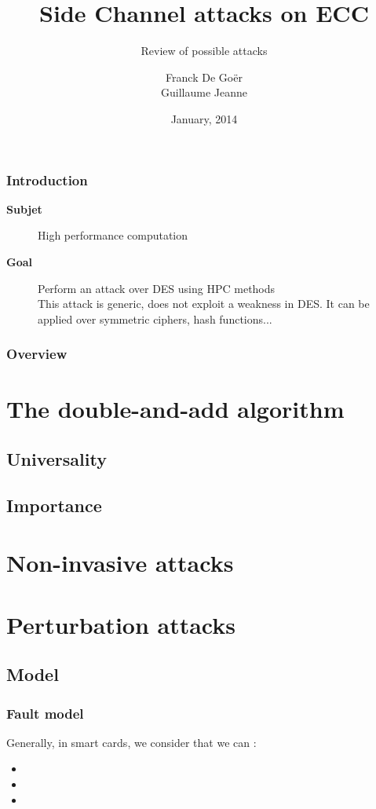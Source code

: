 \documentclass{beamer}
\title[ECC Side channel attacks]{Side Channel attacks on ECC}
\subtitle{Review of possible attacks}
\author{Franck De Goër\\Guillaume Jeanne}
\institute{SCCI - Ensimag}
\date{January, 2014}
\begin{document}
\begin{frame}
    \titlepage
\end{frame}

\begin{frame}[t]
    \frametitle{Introduction}
    \vspace{1cm}
    \begin{description}
        \item[{\bf Subjet}] High performance computation
        \item[{\bf Goal}] Perform an attack over DES using HPC methods\\
	This attack is generic, does not exploit a weakness in DES.
	It can be applied over symmetric ciphers, hash functions...
    \end{description}
\end{frame}

\begin{frame}
    \frametitle{Overview}
    \tableofcontents
\end{frame}


\section{The double-and-add algorithm}
    \subsection{Universality}
    \subsection{Importance}

\section{Non-invasive attacks}

\section{Perturbation attacks}
    \subsection{Model}

    \begin{frame}
        \frametitle{Fault model}
            Generally, in smart cards, we consider that we can :
            \begin{itemize}
                \item {}
                \item {}
                \item {}
            \end{itemize}
    \end{frame}
\end{document}
